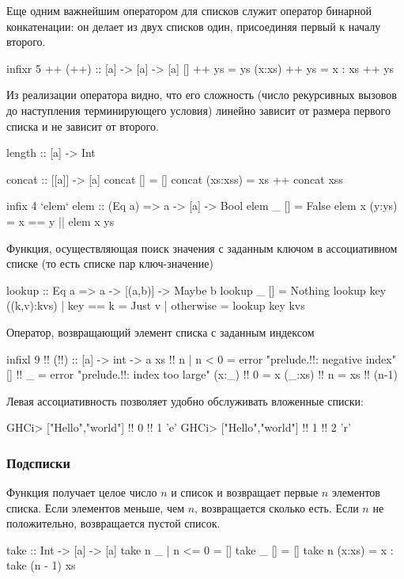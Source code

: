 \documentclass[11pt,a4paper]{article}
\begin{document}
Еще одним важнейшим оператором для списков служит оператор бинарной конкатенации: он делает из двух списков один, присоединяя первый к началу второго.
\begin{hscode}
infixr 5 ++
(++) :: [a] -> [a] -> [a]
[] ++ ys = ys
(x:xs) ++ ys = x : xs ++ ys
\end{hscode}
Из реализации оператора видно, что его сложность (число рекурсивных вызовов до наступления терминирующего условия) линейно зависит от размера первого списка и не зависит от второго.

\begin{hscode}
length :: [a] -> Int

concat :: [[a]] -> [a]
concat [] = []
concat (xs:xss) = xs ++ concat xss

infix 4 `elem`
elem :: (Eq a) => a -> [a] -> Bool
elem _ [] = False
elem x (y:ys) = x == y || elem x ys
\end{hscode}

Функция, осуществляющая поиск значения с заданным ключом в ассоциативном списке (то есть списке пар ключ-значение)
\begin{hscode}
lookup :: Eq a => a -> [(a,b)] -> Maybe b
lookup _ [] = Nothing
lookup key ((k,v):kvs)
  | key == k = Just v
  | otherwise = lookup key kvs
\end{hscode}

Оператор, возвращающий элемент списка с заданным индексом
\begin{hscode}
infixl 9 !!
(!!) :: [a] -> int -> a
xs     !! n | n < 0 = error "prelude.!!: negative index"
[]     !! _         = error "prelude.!!: index too large"
(x:_)  !! 0         = x
(_:xs) !! n         = xs !! (n-1)
\end{hscode}
Левая ассоциативность позволяет удобно обслуживать вложенные списки:
\begin{hscode}
GHCi> ["Hello","world"] !! 0 !! 1
'e'
GHCi> ["Hello","world"] !! 1 !! 2
'r'
\end{hscode}
\subsubsection{Подсписки}
Функция  получает целое число $ n$ и список и возвращает первые $ n$ элементов списка. Если элементов меньше, чем $ n$, возвращается сколько есть. Если $ n$ не положительно, возвращается пустой список.
\begin{hscode}
take :: Int -> [a] -> [a]
take n _ | n <= 0 = []
take _ []         = []
take n (x:xs)     = x : take (n - 1) xs
\end{hscode}
\end{document}

